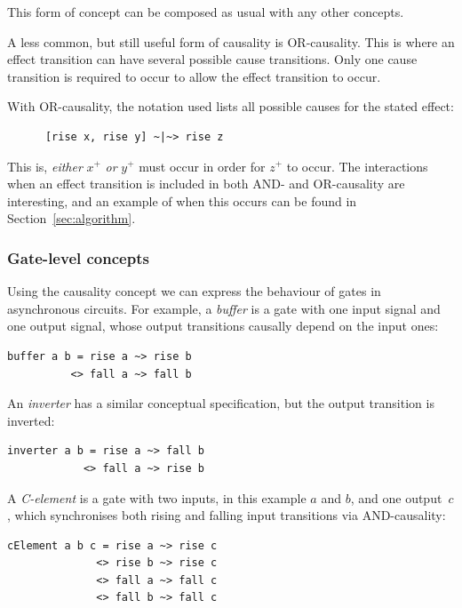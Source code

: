 \documentclass[british,conference,compsoc]{IEEEtran}
\begin{document}
This form of concept can be composed as usual with any other concepts.

A less common, but still useful form of causality is OR-causality. This is 
where an effect transition can have several possible cause transitions. Only 
one cause transition is required to occur to allow the effect transition to 
occur. 

With OR-causality, the notation used lists all possible causes for the stated 
effect:

\begin{verbatim}
      [rise x, rise y] ~|~> rise z
\end{verbatim}

This is, \emph{either} $x^{+}$ \emph{or} $y^{+}$ must occur in order for 
$z^{+}$ to occur. The interactions when an effect transition is included in both AND- and 
OR-causality are interesting, and an example of when this occurs can be found 
in Section~\ref{sec:algorithm}.

\vspace{-2mm}

\subsubsection{Gate-level concepts} Using the causality concept we can express
the behaviour of gates in asynchronous circuits. For example, a \emph{buffer}
is a gate with one input signal and one output signal,
whose output transitions causally depend on the input ones:

\begin{verbatim}
buffer a b = rise a ~> rise b 
          <> fall a ~> fall b
\end{verbatim}

\noindent An \emph{inverter} has a similar conceptual specification, but the
output transition is inverted:

\begin{verbatim}
inverter a b = rise a ~> fall b
            <> fall a ~> rise b
\end{verbatim}

\noindent A \emph{C-element} is a gate with two inputs, in this example $a$ and $b$, and one
output~$c$, which synchronises both rising and falling input transitions
via AND-causality:

\begin{verbatim}
cElement a b c = rise a ~> rise c 
              <> rise b ~> rise c
              <> fall a ~> fall c 
              <> fall b ~> fall c
\end{verbatim}
\end{document}
